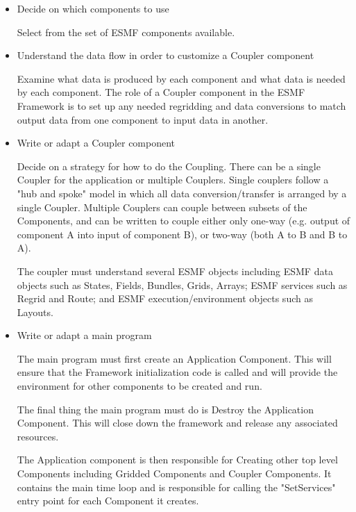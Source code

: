 \begin{itemize}

\item Decide on which components to use 

Select from the set of ESMF components available.

\item Understand the data flow in order to customize a Coupler component

Examine what data is produced by each component and what data is
needed by each component.  The role of a Coupler component in the
ESMF Framework is to set up any needed regridding and data conversions
to match output data from one component to input data in another.

\item Write or adapt a Coupler component

Decide on a strategy for how to do the Coupling.  There can be a single
Coupler for the application or multiple Couplers.
Single couplers follow a "hub and
spoke" model in which all data conversion/transfer is arranged
by a single Coupler.
Multiple Couplers can couple between subsets of the Components, and
can be written to couple either only one-way
(e.g. output of component A into input of component B), or two-way
(both A to B and B to A).  

The coupler must understand several ESMF objects including ESMF data objects
such as States, Fields, Bundles, Grids, Arrays; ESMF services
such as Regrid and Route; and ESMF execution/environment objects
such as Layouts.    

\item Write or adapt a main program 

The main program must first create an Application Component.  This
will ensure that the Framework initialization code is called and will
provide the environment for other components to be created and run.

The final thing the main program must do is Destroy the Application 
Component.
This will close down the framework and release any associated resources.

The Application component is then responsible for Creating other top level
Components including Gridded Components and Coupler Components.  It
contains the main time loop and is responsible for calling the
"SetServices" entry point for each Component it creates.

\end{itemize}




























